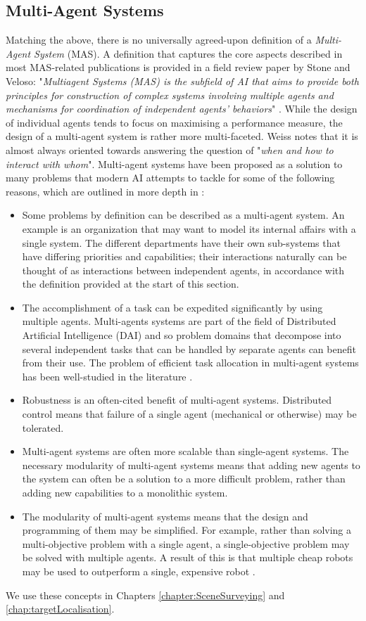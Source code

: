 \subsection{Multi-Agent Systems}
Matching the above, there is no universally agreed-upon definition of a \emph{Multi-Agent System} (MAS). A definition that captures the core aspects described in most MAS-related publications is provided in a field review paper by Stone and Veloso: "\textit{Multiagent Systems (MAS) is the subfield of AI that aims to provide both principles for construction of  complex  systems  involving  multiple  agents  and  mechanisms  for  coordination  of  independent  agents’ behaviors}" \cite{Stone2000MultiagentPerspective}. While the design of individual agents tends to focus on maximising a performance measure, the design of a multi-agent system is rather more multi-faceted. Weiss \cite{MAS:AModernApproachToDAI} notes that it is almost always oriented towards answering the question of "\textit{when and how to interact with whom}". Multi-agent systems have been proposed as a solution to many problems that modern AI attempts to tackle for some of the following reasons, which are outlined in more depth in \cite{Stone2000MultiagentPerspective}: 
\begin{itemize}
    \item Some problems by definition can be described as a multi-agent system. An example is an organization that may want to model its internal affairs with a single system. The different departments have their own sub-systems that have differing priorities and capabilities; their interactions naturally can be thought of as interactions between independent agents, in accordance with the definition provided at the start of this section.
    \item The accomplishment of a task can be expedited significantly by using multiple agents. Multi-agents systems are part of the field of Distributed Artificial Intelligence (DAI) and so problem domains that decompose into several independent tasks that can be handled by separate agents can benefit from their use. The problem of efficient task allocation in multi-agent systems has been well-studied in the literature \cite{Gerkey2004ASystems}. 
    \item Robustness is an often-cited benefit of multi-agent systems. Distributed control means that failure of a single agent (mechanical or otherwise) may be tolerated.
    \item Multi-agent systems are often more scalable than single-agent systems. The necessary modularity of multi-agent systems means that adding new agents to the system can often be a solution to a more difficult problem, rather than adding new capabilities to a monolithic system. 
    \item The modularity of multi-agent systems means that the design and programming of them may be simplified. For example, rather than solving a multi-objective problem with a single agent, a single-objective problem may be solved with multiple agents. A result of this is that multiple cheap robots may be used to outperform a single, expensive robot \cite{Grabowski2000HeterogeneousExploration}.
\end{itemize}
We use these concepts in Chapters \ref{chapter:SceneSurveying} and \ref{chap:targetLocalisation}.
\par

